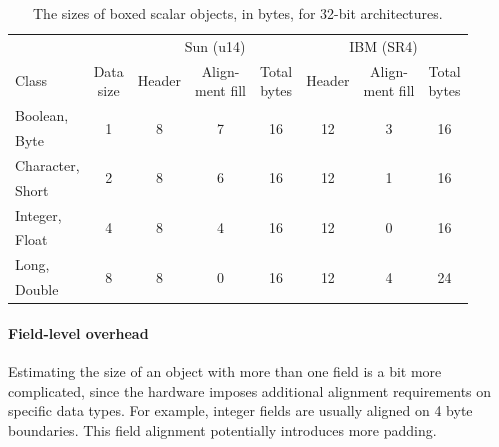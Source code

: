 \begin{table}
  \centering
	\begin{tabular}{lccccccc} \toprule
    	& & \multicolumn{3}{c}{Sun \javasix (u14)} & \multicolumn{3}{c}{IBM
    	\javasix (SR4)} \\ \cmidrule(r){3-5} \cmidrule(l){6-8}
    	Class & \shortstack[c]{Data\\size} & Header & \shortstack{Align-\\ment
    	fill} & \shortstack[c]{Total\\bytes} & Header & \shortstack{Align-\\ment
    	fill} & \shortstack[c]{Total\\bytes}
    	\\ \midrule 
    	{Boolean,} & \multirow{2}{*}{1} & \multirow{2}{*}{8} & \multirow{2}{*}{7} &
    	\multirow{2}{*}{16} & \multirow{2}{*}{12} & \multirow{2}{*}{3} &
    	\multirow{2}{*}{16}
    	\\
    	Byte & \\ \addlinespace
    	Character, & \multirow{2}{*}{2} & \multirow{2}{*}{8} & \multirow{2}{*}{6}
    	& \multirow{2}{*}{16} & \multirow{2}{*}{12} & \multirow{2}{*}{1} &
    	\multirow{2}{*}{16} \\
    	Short & \\ \addlinespace
    	Integer, & \multirow{2}{*}{4} & \multirow{2}{*}{8} & \multirow{2}{*}{4} &
    	\multirow{2}{*}{16} & \multirow{2}{*}{12} & \multirow{2}{*}{0} &
    	\multirow{2}{*}{16}
    	\\
    	Float & \\ \addlinespace
    	Long, & \multirow{2}{*}{8} & \multirow{2}{*}{8} & \multirow{2}{*}{0} &
    	\multirow{2}{*}{16} & \multirow{2}{*}{12} & \multirow{2}{*}{4} &
    	\multirow{2}{*}{24} \\
    	Double & \\
		\bottomrule
	\end{tabular}
  \caption{The sizes of boxed scalar objects, in bytes, for 32-bit
  architectures.}
  \label{tab:boxed-scalar-sizes}
\end{table}
 
\paragraph{Field-level overhead} Estimating the size of an object with more
than one field is a bit more complicated, since the hardware imposes additional
alignment requirements on specific data types. For example, integer fields are
usually aligned on 4 byte boundaries. This field alignment potentially introduces more padding.

